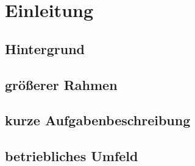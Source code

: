 \section{Einleitung}
	\subsection{Hintergrund}
	\subsection{größerer Rahmen}
	\subsection{kurze Aufgabenbeschreibung}
	\subsection{betriebliches Umfeld}